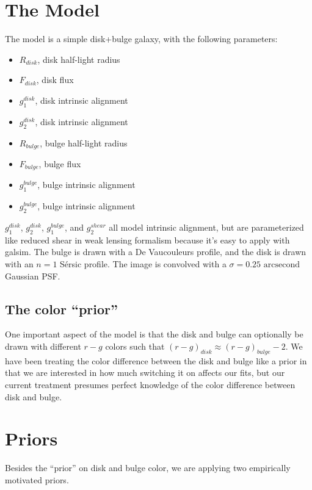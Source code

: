 \documentclass{article}
\begin{document}
\section{The Model}
The model is a simple disk+bulge galaxy, with the following parameters:
\begin{itemize}
\item $R_{disk}$, disk half-light radius
\item $F_{disk}$, disk flux
\item $g_1^{disk}$, disk intrinsic alignment
\item $g_2^{disk}$, disk intrinsic alignment
\item $R_{bulge}$, bulge half-light radius
\item $F_{bulge}$, bulge flux
\item $g_1^{bulge}$, bulge intrinsic alignment
\item $g_2^{bulge}$, bulge intrinsic alignment
\end{itemize}
$g_1^{disk}$, $g_2^{disk}$, $g_1^{bulge}$, and $g_2^{shear}$ all model
intrinsic alignment, but are parameterized like reduced shear in weak
lensing formalism because it's easy to apply with galsim.  The bulge
is drawn with a De Vaucouleurs profile, and the disk is drawn with an
$n=1$ S\'{e}rsic profile.  The image is convolved with a $\sigma = 0.25
\textrm{ arcsecond}$ Gaussian PSF.

\subsection{The color ``prior''}
One important aspect of the model is that the disk and bulge can
optionally be drawn with different $r-g$ colors such that
$(r-g)_{disk} \approx (r-g)_{bulge} - 2$.   We have
been treating the color difference between the disk and bulge like a
prior in that we are interested in how much switching it on affects
our fits, but our current treatment presumes perfect knowledge of the
color difference between disk and bulge.


\section{Priors}
Besides the ``prior'' on disk and bulge color, we are applying two
empirically motivated priors.
\end{document}
